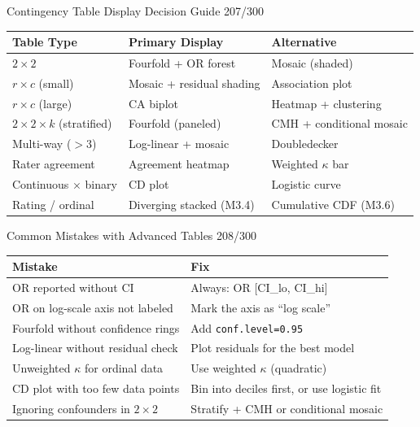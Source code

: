 \documentclass[10pt]{beamer}
\newcommand{\smark}[1]{\hfill{\scriptsize\color{codegray}#1}}
\begin{document}
\begin{frame}{Contingency Table Display Decision Guide}
\smark{207/300}
\centering\small
\begin{tabular}{@{}lll@{}}
    \toprule
    \textbf{Table Type} & \textbf{Primary Display} & \textbf{Alternative} \\
    \midrule
    $2 \times 2$                  & Fourfold + OR forest      & Mosaic (shaded) \\
    $r \times c$ (small)          & Mosaic + residual shading & Association plot \\
    $r \times c$ (large)          & CA biplot                 & Heatmap + clustering \\
    $2 \times 2 \times k$ (stratified)& Fourfold (paneled)   & CMH + conditional mosaic \\
    Multi-way ($> 3$)             & Log-linear + mosaic       & Doubledecker \\
    Rater agreement               & Agreement heatmap         & Weighted $\kappa$ bar \\
    Continuous $\times$ binary    & CD plot                   & Logistic curve \\
    Rating / ordinal              & Diverging stacked (M3.4)  & Cumulative CDF (M3.6) \\
    \bottomrule
\end{tabular}
\end{frame}

\begin{frame}{Common Mistakes with Advanced Tables}
\smark{208/300}
\centering\small
\begin{tabular}{@{}ll@{}}
    \toprule
    \textbf{Mistake} & \textbf{Fix} \\
    \midrule
    OR reported without CI                  & Always: OR [CI\_lo, CI\_hi] \\
    OR on log-scale axis not labeled        & Mark the axis as ``log scale'' \\
    Fourfold without confidence rings       & Add \texttt{conf.level=0.95} \\
    Log-linear without residual check       & Plot residuals for the best model \\
    Unweighted $\kappa$ for ordinal data    & Use weighted $\kappa$ (quadratic) \\
    CD plot with too few data points        & Bin into deciles first, or use logistic fit \\
    Ignoring confounders in $2 \times 2$    & Stratify + CMH or conditional mosaic \\
    \bottomrule
\end{tabular}
\end{frame}
\end{document}
